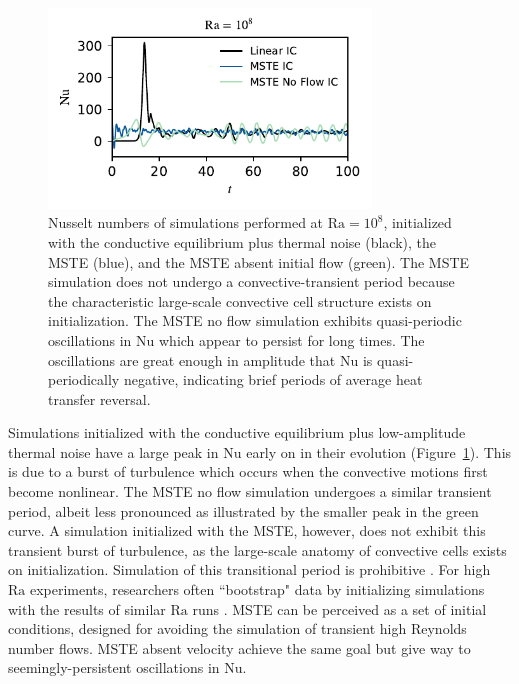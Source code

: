 \documentclass[reprint,amsmath,amssymb,aps,nofootinbib]{revtex4-1}
\newcommand\Ra{\mathrm{Ra}}
\newcommand\Nu{\mathrm{Nu}}
\begin{document}
\begin{figure}
    \centering
    \includegraphics[width=3.375in]{sim_eq_nu_noflow.pdf}
    \caption{Nusselt numbers of simulations performed at $\Ra = 10^8$, initialized with the conductive equilibrium plus thermal noise (black), the MSTE (blue), and the MSTE absent initial flow (green). 
    The MSTE simulation does not undergo a convective-transient period because the characteristic large-scale convective cell structure exists on initialization.
    The MSTE no flow simulation exhibits quasi-periodic oscillations in $\Nu$ which appear to persist for long times.
    The oscillations are great enough in amplitude that $\Nu$ is quasi-periodically negative, indicating brief periods of average heat transfer reversal.}
    \label{fig:nu_sim}
\end{figure}

Simulations initialized with the conductive equilibrium plus low-amplitude thermal noise have a large peak in $\Nu$ early on in their evolution (Figure~\ref{fig:nu_sim}).
This is due to a burst of turbulence which occurs when the convective motions first become nonlinear.
The MSTE no flow simulation undergoes a similar transient period, albeit less pronounced as illustrated by the smaller peak in the green curve.
A simulation initialized with the MSTE, however, does not exhibit this transient burst of turbulence, as the large-scale anatomy of convective cells exists on initialization. 
Simulation of this transitional period is prohibitive \cite{Anders_AE}. 
For high $\Ra$ experiments, researchers often ``bootstrap" data by initializing simulations with the results of similar $\Ra$ runs \cite{Verzicco, Johnston}. 
MSTE can be perceived as a set of initial conditions, designed for avoiding the simulation of transient high Reynolds number flows.
MSTE absent velocity achieve the same goal but give way to seemingly-persistent oscillations in $\Nu$. 
\end{document}
